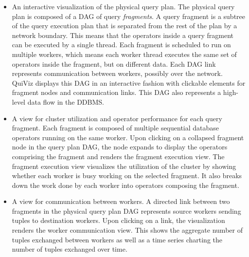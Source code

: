 \documentclass{chi2009}
\newcommand*{\system}{QuiViz\xspace}
\begin{document}
\begin{itemize}

\item An interactive visualization of the physical query plan. The physical
query plan is composed of a DAG of query \emph{fragments}. A query
fragment is a subtree of the query execution plan that is separated from the
rest of the plan by a network boundary. This means that the operators inside a
query fragment can be executed by a single thread. Each fragment is scheduled
to run on multiple workers, which means each worker thread executes the same set of
operators inside the fragment, but on different data. Each DAG link represents
communication between workers, possibly over the network.  \system displays
this DAG in an interactive fashion with clickable elements for fragment nodes
and communication links.  This DAG also represents a high-level data flow in
the DDBMS.

\item A view for cluster utilization and operator performance for each query fragment. Each fragment is composed of
multiple sequential database operators running on the same worker. Upon clicking on a collapsed fragment node in the
query plan DAG, the node expands to display the operators comprising the fragment and renders the fragment execution view.
The fragment execution view visualizes the utilization of the cluster by showing whether each worker is busy working
on the selected fragment. It also breaks down the work done by each worker into operators composing the fragment.

\item A view for communication between workers. A directed link between two fragments in the physical query plan DAG
represents source workers sending tuples to destination workers. Upon clicking on a link, the visualization renders the
worker communication view. This shows the aggregate number of tuples exchanged between workers as well as a time series
charting the number of tuples exchanged over time.

\end{itemize}



\end{document}
